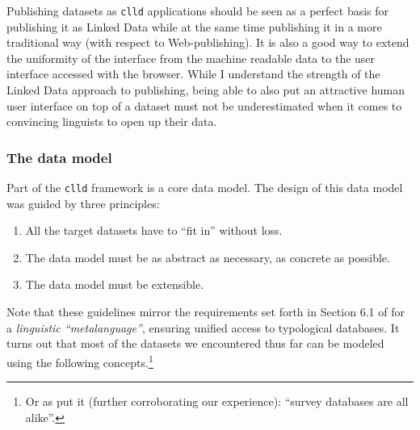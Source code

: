 \documentclass[a4paper,10pt]{article}
\begin{document}
Publishing datasets as \texttt{clld} applications should be seen as a perfect basis for publishing it as Linked Data while at the same time publishing it in a more traditional way (with respect to Web-publishing). It is also a good way to extend the uniformity of the interface from the machine readable data to the user interface accessed with the browser.
While I understand the strength of the Linked Data approach to publishing, being able to also put an attractive human user interface on top of a dataset must not be underestimated when it comes to convincing linguists to open up their data.



\subsubsection{The data model}
\label{sec:datamodel}

Part of the \texttt{clld} framework is a core data model.
The design of this data model was guided by three principles:
\begin{enumerate}
\item All the target datasets have to ``fit in'' without loss.
\item The data model must be as abstract as necessary, as concrete as possible.
\item The data model must be extensible.
\end{enumerate}

Note that these guidelines mirror the requirements set forth in Section 6.1 of  for a \emph{linguistic ``metalanguage''}, ensuring unified access to typological databases.
It turns out that most of the datasets we encountered thus far can be modeled using the following concepts.\footnote{Or as  put it (further corroborating our experience): ``survey databases are all alike''.}

%
%
\end{document}
